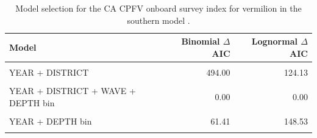 \documentclass[
  english,
  a4paper,
]{article}
\begin{document}
\FloatBarrier

\begin{table}

\caption{\label{tab:tab-model-select-cpfvonboard}Model selection for the CA CPFV onboard survey index for vermilion in the southern model .}
\centering
\begin{tabular}[t]{lrr}
\toprule
Model & Binomial $\Delta$AIC & Lognormal $\Delta$AIC\\
\midrule
\cellcolor{gray!6}{1} & \cellcolor{gray!6}{725.28} & \cellcolor{gray!6}{568.97}\\
YEAR + DISTRICT & 494.00 & 124.13\\
\cellcolor{gray!6}{YEAR + DISTRICT + WAVE} & \cellcolor{gray!6}{450.48} & \cellcolor{gray!6}{109.82}\\
YEAR + DISTRICT + WAVE + DEPTH bin & 0.00 & 0.00\\
\cellcolor{gray!6}{YEAR + WAVE + DEPTH bin} & \cellcolor{gray!6}{41.38} & \cellcolor{gray!6}{132.83}\\
\addlinespace
YEAR + DEPTH bin & 61.41 & 148.53\\
\cellcolor{gray!6}{YEAR + DISTRICT + DEPTH bin} & \cellcolor{gray!6}{10.88} & \cellcolor{gray!6}{3.65}\\
\bottomrule
\end{tabular}
\end{table}

\FloatBarrier
\end{document}
